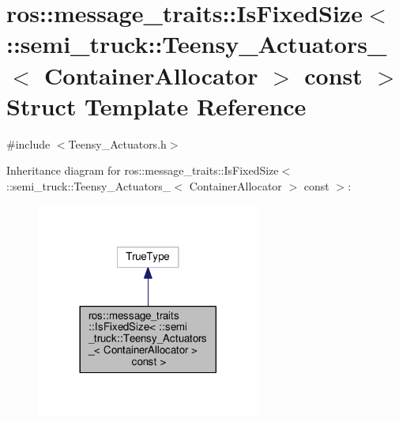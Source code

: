 \hypertarget{structros_1_1message__traits_1_1_is_fixed_size_3_01_1_1semi__truck_1_1_teensy___actuators___3_01e88fb587a6d6e04d6a7968cdf33bb127}{}\section{ros\+:\+:message\+\_\+traits\+:\+:Is\+Fixed\+Size$<$ \+:\+:semi\+\_\+truck\+:\+:Teensy\+\_\+\+Actuators\+\_\+$<$ Container\+Allocator $>$ const $>$ Struct Template Reference}
\label{structros_1_1message__traits_1_1_is_fixed_size_3_01_1_1semi__truck_1_1_teensy___actuators___3_01e88fb587a6d6e04d6a7968cdf33bb127}


{\ttfamily \#include $<$Teensy\+\_\+\+Actuators.\+h$>$}



Inheritance diagram for ros\+:\+:message\+\_\+traits\+:\+:Is\+Fixed\+Size$<$ \+:\+:semi\+\_\+truck\+:\+:Teensy\+\_\+\+Actuators\+\_\+$<$ Container\+Allocator $>$ const $>$\+:\nopagebreak
\begin{figure}[H]
\begin{center}
\leavevmode
\includegraphics[width=209pt]{structros_1_1message__traits_1_1_is_fixed_size_3_01_1_1semi__truck_1_1_teensy___actuators___3_01a04aa7b95ef0ff2957962baed1b65541}
\end{center}
\end{figure}


